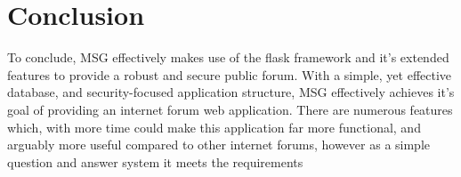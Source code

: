 \documentclass[10pt, a4paper]{article}
\begin{document}
    \section{Conclusion}
    To conclude, MSG effectively makes use of the flask framework and it's extended features to provide a robust and secure public forum. With a simple, yet effective database, and security-focused application structure, MSG effectively achieves it's goal of providing an internet forum web application. There are numerous features which, with more time could make this application far more functional, and arguably more useful compared to other internet forums, however as a simple question and answer system it meets the requirements
    


		
\end{document}
